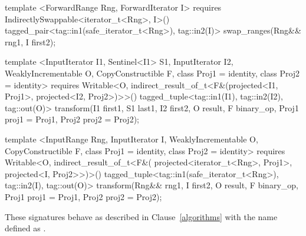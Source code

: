 \begin{codeblock}
template <ForwardRange Rng, ForwardIterator I>
  requires IndirectlySwappable<iterator_t<Rng>, I>()
  tagged_pair<tag::in1(safe_iterator_t<Rng>), tag::in2(I)>
    swap_ranges(Rng&& rng1, I first2);

template <InputIterator I1, Sentinel<I1> S1, InputIterator I2, WeaklyIncrementable O,
    CopyConstructible F, class Proj1 = identity, class Proj2 = identity>
  requires Writable<O, indirect_result_of_t<F&(projected<I1, Proj1>, projected<I2, Proj2>)>>()
  tagged_tuple<tag::in1(I1), tag::in2(I2), tag::out(O)>
    transform(I1 first1, S1 last1, I2 first2, O result,
              F binary_op, Proj1 proj1 = Proj1{}, Proj2 proj2 = Proj2{});

template <InputRange Rng, InputIterator I, WeaklyIncrementable O, CopyConstructible F,
    class Proj1 = identity, class Proj2 = identity>
  requires Writable<O, indirect_result_of_t<F&(
    projected<iterator_t<Rng>, Proj1>, projected<I, Proj2>>)>()
  tagged_tuple<tag::in1(safe_iterator_t<Rng>), tag::in2(I), tag::out(O)>
    transform(Rng&& rng1, I first2, O result,
              F binary_op, Proj1 proj1 = Proj1{}, Proj2 proj2 = Proj2{});
\end{codeblock}

\remark These signatures behave as described in Clause~\ref{algorithms} with the name
 defined as .